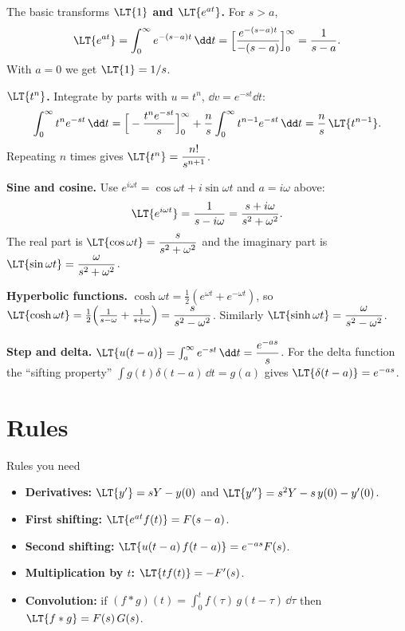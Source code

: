 \begin{derivbox}{The basic transforms}
\textbf{$\LT\{1\}$ and $\LT\{e^{at}\}$.} For $s>a$,
\[ \LT\{e^{at}\} = \int_0^\infty e^{-(s-a)t}\,\dd t = \Big[\frac{e^{-(s-a)t}}{-(s-a)}\Big]_0^\infty = \frac{1}{s-a}. \]
With $a=0$ we get $\LT\{1\} = 1/s$.

\textbf{$\LT\{t^n\}$.} Integrate by parts with $u = t^n$, $\dd v = e^{-st}\dd t$:
\[ \int_0^\infty t^ne^{-st}\,\dd t = \Big[-\frac{t^ne^{-st}}{s}\Big]_0^\infty + \frac ns\int_0^\infty t^{n-1}e^{-st}\,\dd t = \frac ns\,\LT\{t^{n-1}\}. \]
Repeating $n$ times gives $\LT\{t^n\} = \dfrac{n!}{s^{n+1}}$.

\textbf{Sine and cosine.} Use $e^{i\omega t} = \cos\omega t + i\sin\omega t$ and $a = i\omega$ above:
\[ \LT\{e^{i\omega t}\} = \frac{1}{s - i\omega} = \frac{s + i\omega}{s^2+\omega^2}. \]
The real part is $\LT\{\cos\omega t\} = \dfrac{s}{s^2+\omega^2}$ and the imaginary part is $\LT\{\sin\omega t\} = \dfrac{\omega}{s^2+\omega^2}$.

\textbf{Hyperbolic functions.} $\cosh\omega t = \frac12(e^{\omega t} + e^{-\omega t})$, so $\LT\{\cosh\omega t\} = \frac12\Big(\frac1{s-\omega} + \frac1{s+\omega}\Big) = \dfrac{s}{s^2-\omega^2}$. Similarly $\LT\{\sinh\omega t\} = \dfrac{\omega}{s^2-\omega^2}$.

\textbf{Step and delta.} $\LT\{u(t-a)\} = \int_a^\infty e^{-st}\,\dd t = \dfrac{e^{-as}}{s}$. For the delta function the ``sifting property'' $\int g(t)\delta(t-a)\,\dd t = g(a)$ gives $\LT\{\delta(t-a)\} = e^{-as}$.
\end{derivbox}

\section{Rules}

\begin{defbox}{Rules you need}
\begin{itemize}
  \item \textbf{Derivatives:} $\LT\{y'\} = sY - y(0)$ \quad and \quad $\LT\{y''\} = s^2Y - s\,y(0) - y'(0)$.
  \item \textbf{First shifting:} $\LT\{e^{at}f(t)\} = F(s-a)$.
  \item \textbf{Second shifting:} $\LT\{u(t-a)\,f(t-a)\} = e^{-as}F(s)$.
  \item \textbf{Multiplication by $t$:} $\LT\{t f(t)\} = -F'(s)$.
  \item \textbf{Convolution:} if $(f*g)(t) = \displaystyle\int_0^t f(\tau)\,g(t-\tau)\,\dd\tau$ then $\LT\{f*g\} = F(s)\,G(s)$.
\end{itemize}
\end{defbox}

